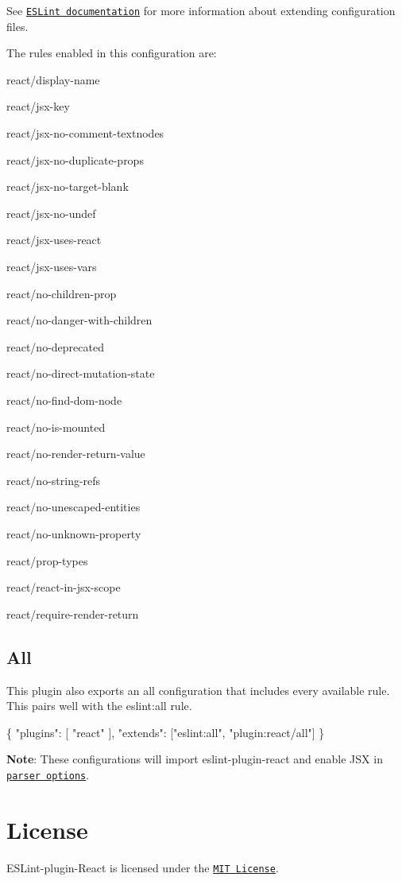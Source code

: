 See \href{http://eslint.org/docs/user-guide/configuring#extending-configuration-files}{\tt E\+S\+Lint documentation} for more information about extending configuration files.

The rules enabled in this configuration are\+:


\begin{DoxyItemize}
\item react/display-\/name
\item react/jsx-\/key
\item react/jsx-\/no-\/comment-\/textnodes
\item react/jsx-\/no-\/duplicate-\/props
\item react/jsx-\/no-\/target-\/blank
\item react/jsx-\/no-\/undef
\item react/jsx-\/uses-\/react
\item react/jsx-\/uses-\/vars
\item react/no-\/children-\/prop
\item react/no-\/danger-\/with-\/children
\item react/no-\/deprecated
\item react/no-\/direct-\/mutation-\/state
\item react/no-\/find-\/dom-\/node
\item react/no-\/is-\/mounted
\item react/no-\/render-\/return-\/value
\item react/no-\/string-\/refs
\item react/no-\/unescaped-\/entities
\item react/no-\/unknown-\/property
\item react/prop-\/types
\item react/react-\/in-\/jsx-\/scope
\item react/require-\/render-\/return
\end{DoxyItemize}

\subsection*{All}

This plugin also exports an {\ttfamily all} configuration that includes every available rule. This pairs well with the {\ttfamily eslint\+:all} rule.


\begin{DoxyCode}
\{
  "plugins": [
    "react"
  ],
  "extends": ["eslint:all", "plugin:react/all"]
\}
\end{DoxyCode}


{\bfseries Note}\+: These configurations will import {\ttfamily eslint-\/plugin-\/react} and enable J\+SX in \href{http://eslint.org/docs/user-guide/configuring#specifying-parser-options}{\tt parser options}.

\section*{License}

E\+S\+Lint-\/plugin-\/\+React is licensed under the \href{http://www.opensource.org/licenses/mit-license.php}{\tt M\+IT License}. 